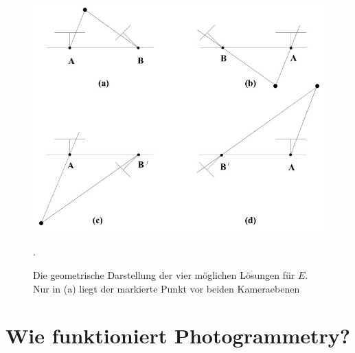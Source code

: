 \begin{figure}[h!]
    \includegraphics[width=\textwidth]{src/img/hartley_2003_e_geometry.jpg}
    \caption{Die geometrische Darstellung der vier möglichen Lösungen für $E$. Nur in (a) liegt der markierte Punkt vor beiden Kameraebenen~\cite[Fig. 9.12]{hartley_2003}}.
    \label{fig:theory-essential-matrix-geometry}
\end{figure}

\section{Wie funktioniert Photogrammetry?}
